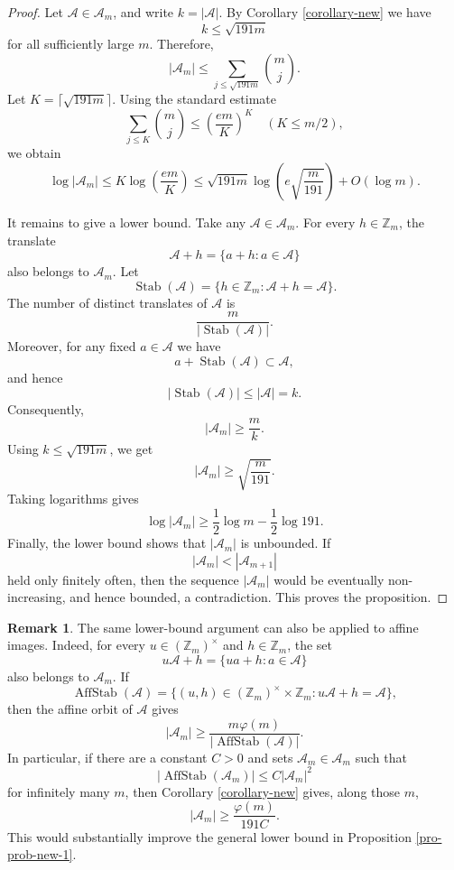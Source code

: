 \documentclass[12pt,a4paper,reqno]{amsart}
\numberwithin{equation}{section}
\theoremstyle{plain}
\theoremstyle{definition}
\newtheorem{remark}{Remark}
\begin{document}
\begin{proof}
Let $\mathcal{A}\in\mathscr A_m$, and write $k=|\mathcal{A}|$.
By Corollary \ref{corollary-new} we have
$$
k\le \sqrt{191m}
$$
for all sufficiently large $m$. Therefore,
\[
    \big|\mathscr A_m\big|
    \le
    \sum_{j\le \sqrt{191m}}\binom mj.
\]
Let $K=\lceil\sqrt{191m}\rceil$. Using the standard estimate
\[
    \sum_{j\le K}\binom mj
    \le
    \left(\frac{em}{K}\right)^K
    \quad (K\le m/2),
\]
we obtain
\[
    \log |\mathscr A_m|
    \le
    K\log\!\left(\frac{em}{K}\right)
    \le
    \sqrt{191m}\log\!\left(e\sqrt{\frac m{191}}\right)+O(\log m).
\]

It remains to give a lower bound. Take any $\mathcal{A}\in\mathscr{A}_m$.
For every $h\in\mathbb Z_m$, the translate
\[
    \mathcal{A}+h=\big\{a+h:a\in \mathcal{A}\big\}
\]
also belongs to $\mathscr A_m$. Let
\[
    \operatorname{Stab}(\mathcal{A})=\{h\in\mathbb Z_m:\mathcal{A}+h=\mathcal{A}\}.
\]
The number of distinct translates of $\mathcal{A}$ is
\[
    \frac{m}{|\operatorname{Stab}(\mathcal{A})|}.
\]
Moreover, for any fixed $a\in \mathcal{A}$ we have
\[
    a+\operatorname{Stab}(\mathcal{A})\subset \mathcal{A},
\]
and hence
\[
    |\operatorname{Stab}(\mathcal{A})|\le |\mathcal{A}|=k.
\]
Consequently,
\[
    |\mathscr A_m|
    \ge
    \frac m k.
\]
Using $k\le \sqrt{191m}$, we get
\[
    |\mathscr A_m|
    \ge
    \sqrt{\frac m{191}}.
\]
Taking logarithms gives
\[
    \log |\mathscr A_m|
    \ge
    \frac12\log m-\frac12\log 191.
\]
Finally, the lower bound shows that $|\mathscr A_m|$ is unbounded. If
\[
|\mathscr A_m|<|\mathscr A_{m+1}|
\]
held only finitely often, then the sequence $|\mathscr A_m|$ would be eventually non-increasing, and hence bounded, a contradiction. This proves the proposition.
\end{proof}

\begin{remark}\label{rem-affine}
The same lower-bound argument can also be applied to affine images. Indeed, for every $u\in(\mathbb Z_m)^\times$ and $h\in\mathbb Z_m$, the set
\[
u\mathcal A+h=\{ua+h:a\in\mathcal A\}
\]
also belongs to $\mathscr A_m$. If
\[
\operatorname{AffStab}(\mathcal A)=\{(u,h)\in(\mathbb Z_m)^\times\times\mathbb Z_m:u\mathcal A+h=\mathcal A\},
\]
then the affine orbit of $\mathcal A$ gives
\[
|\mathscr A_m|\ge \frac{m\varphi(m)}{|\operatorname{AffStab}(\mathcal A)|}.
\]
In particular, if there are a constant $C>0$ and sets $\mathcal A_m\in\mathscr A_m$ such that
\[
|\operatorname{AffStab}(\mathcal A_m)|\le C|\mathcal A_m|^2
\]
for infinitely many $m$, then Corollary \ref{corollary-new} gives, along those $m$,
\[
|\mathscr A_m|\ge \frac{\varphi(m)}{191C}.
\]
This would substantially improve the general lower bound in Proposition \ref{pro-prob-new-1}.
\end{remark}
\end{document}
